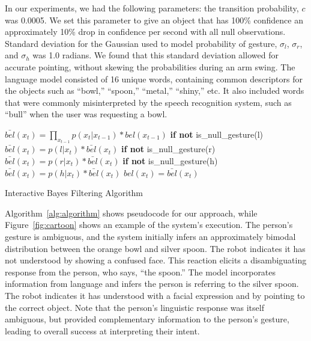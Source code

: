 \documentclass[letterpaper, 10 pt, conference]{ieeeconf}
\begin{document}
In our experiments, we had the following parameters: the transition
probability, $c$ was 0.0005. We set this parameter to give an object
that has 100\% confidence an approximately 10\% drop in confidence per
second with all null observations.  Standard deviation for the
Gaussian used to model probability of gesture, $\sigma_l$, $\sigma_r$,
and $\sigma_h$ was 1.0 radians. We found that this standard deviation
allowed for accurate pointing, without skewing the probabilities
during an arm swing.  The language model consisted of 16 unique words,
containing common descriptors for the objects such as ``bowl,''
``spoon,'' ``metal,'' ``shiny,'' etc. It also included words that were
commonly misinterpreted by the speech recognition system, such as
``bull'' when the user was requesting a bowl.


\begin{algorithm}
    \DontPrintSemicolon
    \BlankLine
    \BlankLine
     {
      $\bar{bel}(x_t) = \displaystyle\prod_{x_{t-1}} p(x_t|x_{t-1})*bel(x_{t-1})$
      \BlankLine
      \textbf{if not} is\_null\_gesture(l)
      \BlankLine
      \Indp$\bar{bel}(x_t) = p(l | x_t) *  \bar{bel}(x_t)$
      \BlankLine
      \Indm\textbf{if not} is\_null\_gesture(r)
      \BlankLine
      \Indp$\bar{bel}(x_t) = p(r | x_t) *  \bar{bel}(x_t)$
      \BlankLine
      \Indm\textbf{if not} is\_null\_gesture(h)
      \BlankLine
      \Indp$\bar{bel}(x_t) = p(h | x_t) *  \bar{bel}(x_t)$
      \BlankLine
      \Indm{}
      $bel(x_t) = \bar{bel}(x_t)$

    }
    \BlankLine
\caption{Interactive Bayes Filtering Algorithm} 
\label{alg:algorithm}
\end{algorithm}

Algorithm~\ref{alg:algorithm} shows pseudocode for our approach, while
Figure~\ref{fig:cartoon} shows an example of the system's execution.
The person's gesture is ambiguous, and the system initially infers an
approximately bimodal distribution between the orange bowl and silver
spoon.  The robot indicates it has not understood by showing a
confused face.  This reaction elicits a disambiguating response from
the person, who says, ``the spoon.''  The model incorporates
information from language and infers the person is referring to the
silver spoon.  The robot indicates it has understood with a facial
expression and by pointing to the correct object.  Note that the
person's linguistic response was itself ambiguous, but provided
complementary information to the person's gesture, leading to overall
success at interpreting their intent.
\end{document}

